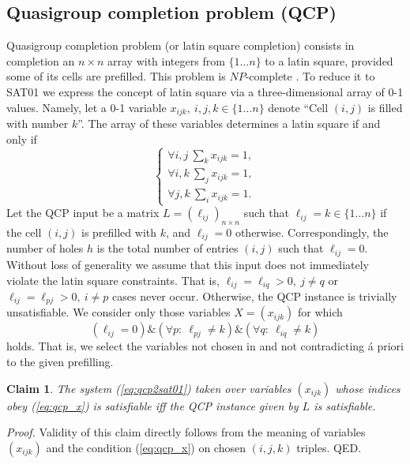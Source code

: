 \documentclass[11pt]{article}
\newtheorem{claim}{Claim}
\begin{document}
\subsection{Quasigroup completion problem (QCP)}
Quasigroup completion problem (or latin square completion) consists in completion an $n \times n$ array with integers from $\{1 \ldots n\}$ to a latin square, provided some of its cells are prefilled. This problem is $NP$-complete \cite{C84}. To reduce it to SAT01 we express the concept of latin square via a three-dimensional array of 0-1 values. Namely, let a 0-1 variable $x_{ijk}, \ i,j,k \in \{1 \ldots n\}$ denote ``Cell $(i,j)$ is filled with number $k$''. The array of these variables determines a latin square if and only if
\begin{equation}
\label{eq:qcp2sat01}
\left\{ \begin{array}{l}
\forall i,j \ \sum_k x_{ijk} = 1, \\
\forall i,k \ \sum_j x_{ijk} = 1, \\
\forall j,k \ \sum_i x_{ijk} = 1.
\end{array} \right.
\end{equation}
Let the QCP input be a matrix $L=(\ell_{ij})_{n \times n}$ such that 
$\ell_{ij}=k \in \{1 \ldots n\}$ if the cell $(i,j)$ is prefilled with $k$, and 
$\ell_{ij}=0$ otherwise. Correspondingly, the number of holes $h$ is the total number of entries $(i,j)$ such that $\ell_{ij}=0$. Without loss of generality we assume that this input does not immediately violate the latin square constraints. That is, $\ell_{ij}=\ell_{iq}>0, \ j \neq q$ or 
$\ell_{ij}=\ell_{pj}>0, \ i \neq p$ cases never occur. Otherwise, the QCP instance is trivially unsatisfiable. We consider only those variables $X=(x_{ijk})$ for which
\begin{equation}
\label{eq:qcp_x}
(\ell_{ij}=0) \& (\forall p: \ \ell_{pj} \neq k) \& (\forall q: \ \ell_{iq} \neq k)
\end{equation}
holds. That is, we select the variables not chosen in and not contradicting \'a priori to the given prefilling.
\begin{claim}
The system (\ref{eq:qcp2sat01}) taken over variables $(x_{ijk})$ whose indices obey (\ref{eq:qcp_x}) is satisfiable iff the QCP instance given by $L$ is satisfiable.
\end{claim}

{\em Proof.\/} Validity of this claim directly follows from the meaning of variables $(x_{ijk})$ and the condition (\ref{eq:qcp_x}) on chosen $(i,j,k)$ triples. QED.
\end{document}
